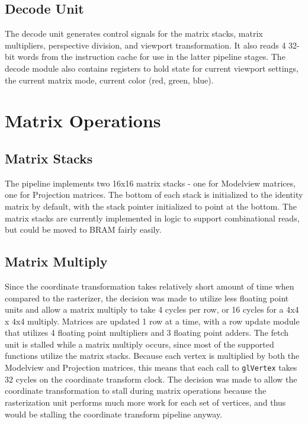 \documentclass[letterpaper,10pt]{article}
\begin{document}
\subsection{Decode Unit}
The decode unit generates control signals for the matrix stacks, matrix multipliers, perspective division, and viewport transformation. It also reads 4 32-bit words from the instruction cache for use in the latter pipeline stages. The decode module also contains registers to hold state for current viewport settings, the current matrix mode, current color (red, green, blue).


\section{Matrix Operations}

\subsection{Matrix Stacks}
The pipeline implements two 16x16 matrix stacks - one for Modelview matrices, one for Projection matrices. The bottom of each stack is initialized to the identity matrix by default, with the stack pointer initialized to point at the bottom. The matrix stacks are currently implemented in logic to support combinational reads, but could be moved to BRAM fairly easily. 

\subsection{Matrix Multiply}
Since the coordinate transformation takes relatively short amount of time when compared to the rasterizer, the decision was made to utilize less floating point units and allow a matrix multiply to take 4 cycles per row, or 16 cycles for a 4x4 x 4x4 multiply. Matrices are updated 1 row at a time, with a row update module that utilizes 4 floating point multipliers and 3 floating point adders. The fetch unit is stalled while a matrix multiply occurs, since most of the supported functions utilize the matrix stacks. Because each vertex is multiplied by both the Modelview and Projection matrices, this means that each call to \verb!glVertex! takes 32 cycles on the coordinate transform clock. The decision was made to allow the coordinate transformation to stall during matrix operations because the rasterization unit performs much more work for each set of vertices, and thus would be stalling the coordinate transform pipeline anyway.
\end{document}
